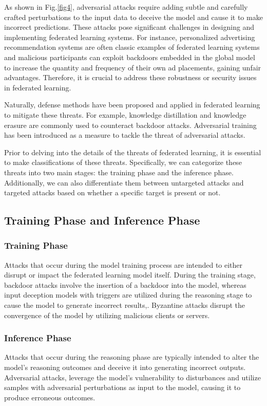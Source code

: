 \documentclass[conference]{IEEEtran}
\begin{document}
As shown in Fig.\ref{fig4}, adversarial attacks\cite{b23,b24,b25,b26} require adding subtle and carefully crafted perturbations 
to the input data to deceive the model and cause it to make incorrect predictions. 
These attacks pose significant challenges in designing and implementing 
federated learning systems. 
For instance, personalized advertising recommendation systems 
are often classic examples of federated learning systems 
and malicious participants can exploit backdoors embedded in the global model 
to increase the quantity and frequency of their own ad placements, 
gaining unfair advantages. 
Therefore, it is crucial to address these robustness or security issues 
in federated learning.

Naturally, defense methods have been proposed and applied in federated learning 
to mitigate these threats. 
For example, knowledge distillation\cite{b28} and knowledge erasure\cite{b29} 
are commonly used to counteract backdoor attacks. 
Adversarial training\cite{b23,b24} has been introduced as a measure to tackle 
the threat of adversarial attacks.

Prior to delving into the details of the threats of federated
learning, it is essential to make classifications of these threats. 
Specifically, we can categorize these threats into two main stages: the
training phase and the inference phase. Additionally, we
can also differentiate them between untargeted attacks and targeted
attacks based on whether a specific target is present or
not.  

\subsection{Training Phase and Inference Phase}
\subsubsection{Training Phase}
Attacks that occur during the model training process are
intended to either disrupt or impact the federated learning model itself. 
During the training stage, 
backdoor attacks involve the insertion of a backdoor into the model, whereas
input deception models with triggers are utilized during the
reasoning stage to cause the model to generate incorrect results\cite{b30},\cite{b31}.
Byzantine attacks disrupt the convergence of the model by utilizing malicious
clients or servers\cite{b21}.
\subsubsection{Inference Phase}Attacks that occur during the reasoning phase are
typically intended to alter the model's reasoning outcomes and deceive it
into generating incorrect outputs\cite{b47}. 
Adversarial attacks, leverage the model's vulnerability
to disturbances and utilize samples with adversarial perturbations as input
to the model, causing it to produce erroneous outcomes.
\end{document}
